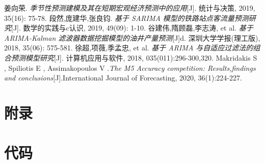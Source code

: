 \documentclass[withoutpreface,bwprint]{cumcmthesis}
\begin{document}
\newpage
\begin{thebibliography}{99}
   姜向荣. \emph{季节性预测建模及其在短期宏观经济预测中的应用}[J].  统计与决策, 2019, 35(16): 75-78.
   段然,庞建华,张良钧. \emph{基于 SARIMA 模型的铁路站点客流量预测研究}[J]. 数学的实践与c认识, 2019, 49(09): 1-10.
   谷建伟,隋顾磊,李志涛, et al. \emph{基于 ARIMA-Kalman 滤波器数据挖掘模型的油井产量预测}[J]d. 深圳大学学报(理工版), 2018, 35(06): 575-581.
   徐超,项薇,季孟忠, et al. \emph{基于 ARIMA 与自适应过滤法的组合预测模型研究}[J]. 计算机应用与软件, 2018, 035(011):296-300,320.
   Makridakis S , Spiliotis E , Assimakopoulos V .\emph{The M5 Accuracy competition: Results,findings and conclusions}[J].International Journal of Forecasting, 2020,
36(1):224-227.

\end{thebibliography}
 
\newpage
\section*{附录}
\section*{代码}
\end{document}
